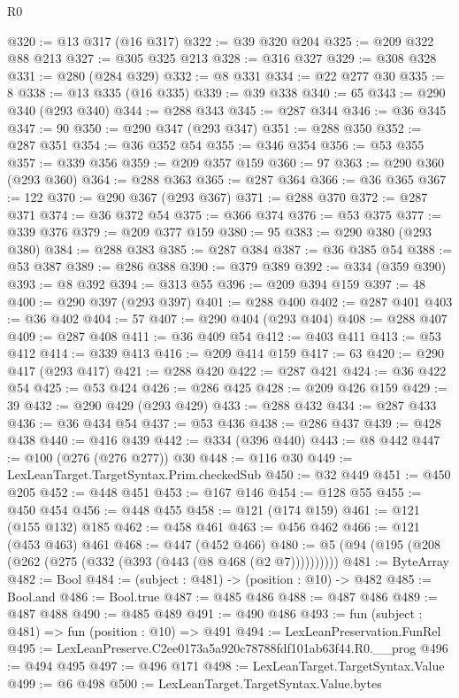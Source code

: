 \begin{lexlean}{R0}
\begin{coremodule}
@320 := @13 @317 (@16 @317)
@322 := @39 @320 @204
@325 := @209 @322 @88 @213
@327 := @305 @325 @213
@328 := @316 @327
@329 := @308 @328
@331 := @280 (@284 @329)
@332 := @8 @331
@334 := @22 @277 @30
@335 := 8
@338 := @13 @335 (@16 @335)
@339 := @39 @338
@340 := 65
@343 := @290 @340 (@293 @340)
@344 := @288 @343
@345 := @287 @344
@346 := @36 @345
@347 := 90
@350 := @290 @347 (@293 @347)
@351 := @288 @350
@352 := @287 @351
@354 := @36 @352 @54
@355 := @346 @354
@356 := @53 @355
@357 := @339 @356
@359 := @209 @357 @159
@360 := 97
@363 := @290 @360 (@293 @360)
@364 := @288 @363
@365 := @287 @364
@366 := @36 @365
@367 := 122
@370 := @290 @367 (@293 @367)
@371 := @288 @370
@372 := @287 @371
@374 := @36 @372 @54
@375 := @366 @374
@376 := @53 @375
@377 := @339 @376
@379 := @209 @377 @159
@380 := 95
@383 := @290 @380 (@293 @380)
@384 := @288 @383
@385 := @287 @384
@387 := @36 @385 @54
@388 := @53 @387
@389 := @286 @388
@390 := @379 @389
@392 := @334 (@359 @390)
@393 := @8 @392
@394 := @313 @55
@396 := @209 @394 @159
@397 := 48
@400 := @290 @397 (@293 @397)
@401 := @288 @400
@402 := @287 @401
@403 := @36 @402
@404 := 57
@407 := @290 @404 (@293 @404)
@408 := @288 @407
@409 := @287 @408
@411 := @36 @409 @54
@412 := @403 @411
@413 := @53 @412
@414 := @339 @413
@416 := @209 @414 @159
@417 := 63
@420 := @290 @417 (@293 @417)
@421 := @288 @420
@422 := @287 @421
@424 := @36 @422 @54
@425 := @53 @424
@426 := @286 @425
@428 := @209 @426 @159
@429 := 39
@432 := @290 @429 (@293 @429)
@433 := @288 @432
@434 := @287 @433
@436 := @36 @434 @54
@437 := @53 @436
@438 := @286 @437
@439 := @428 @438
@440 := @416 @439
@442 := @334 (@396 @440)
@443 := @8 @442
@447 := @100 (@276 (@276 @277)) @30
@448 := @116 @30
@449 := LexLeanTarget.TargetSyntax.Prim.checkedSub
@450 := @32 @449
@451 := @450 @205
@452 := @448 @451
@453 := @167 @146
@454 := @128 @55
@455 := @450 @454
@456 := @448 @455
@458 := @121 (@174 @159)
@461 := @121 (@155 @132) @185
@462 := @458 @461
@463 := @456 @462
@466 := @121 (@453 @463) @461
@468 := @447 (@452 @466)
@480 := @5 (@94 (@195 (@208 (@262 (@275 (@332 (@393 (@443 (@8 @468 (@2 @7))))))))))
@481 := ByteArray
@482 := Bool
@484 := (subject : @481) -> (position : @10) -> @482
@485 := Bool.and
@486 := Bool.true
@487 := @485 @486
@488 := @487 @486
@489 := @487 @488
@490 := @485 @489
@491 := @490 @486
@493 := fun (subject : @481) => fun (position : @10) => @491
@494 := LexLeanPreservation.FunRel
@495 := LexLeanPreserve.C2ee0173a5a920c78788fdf101ab63f44.R0.__prog
@496 := @494 @495
@497 := @496 @171
@498 := LexLeanTarget.TargetSyntax.Value
@499 := @6 @498
@500 := LexLeanTarget.TargetSyntax.Value.bytes

\end{coremodule}
\end{lexlean}

